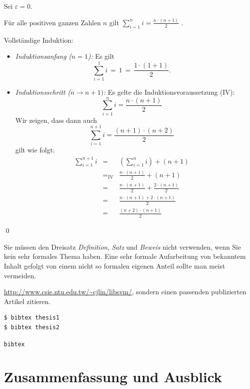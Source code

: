 \documentclass[11pt,a4paper]{report}
\begin{document}
\begin{definition}
Sei $\varepsilon = 0$.
\end{definition}

\begin{satz}
Für alle positiven ganzen Zahlen $n$ gilt 
$\sum_{i=1}^n i = \frac{n \cdot (n+1)}{2}$ \enspace.
\end{satz}
\begin{beweis}
Vollständige Induktion:
\begin{itemize}
\item \emph{Induktionsanfang ($n=1$):} Es gilt  
\[
  \sum_{i=1}^1 i \, = \, 1 \, = \, \frac{1 \cdot (1+1)}{2}.
\]
\item \emph{Induktionsschritt ($n \rightarrow n+1)$:}
Es gelte die Induktionsvoraussetzung (IV):
\[
\sum_{i=1}^n i = \frac{n \cdot (n+1)}{2}
\]
Wir zeigen, dass dann auch 
\[
\sum_{i=1}^{n+1} i = \frac{(n+1) \cdot (n+2)}{2}
\]
gilt wie folgt:
\begin{eqnarray*}
  \sum_{i=1}^{n+1} i 
  & = & (\sum_{i=1}^{n} i) + (n+1)  \\
  & =_{\mbox{IV}} & \frac{n \cdot (n+1)}{2} + (n+1) \\
  & = & \frac{n \cdot (n+1)}{2} + \frac{2 \cdot (n+1)}{2} \\
  & = & \frac{n \cdot (n+1) + 2 \cdot (n+1)}{2} \\
  & = & \frac{(n+2) \cdot (n+1)}{2} 
\end{eqnarray*}
\end{itemize}
\qed
\end{beweis}
Sie müssen den Dreisatz 
\emph{Definition}, \emph{Satz} und \emph{Beweis} nicht verwenden, 
wenn Sie kein sehr formales Thema haben. 
Eine sehr formale Aufarbeitung von bekanntem Inhalt gefolgt 
von einem nicht so formalen eigenen Anteil sollte man 
meist vermeiden.

\url{http://www.csie.ntu.edu.tw/~cjlin/libsvm/}, 
sondern einen passenden publizierten Artikel zitieren.

\begin{verbatim}
$ bibtex thesis1
$ bibtex thesis2
\end{verbatim}
\verb|bibtex|


\chapter{Zusammenfassung und Ausblick} \label{chap:fazit}
\end{document}
